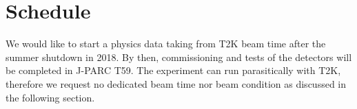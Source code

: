 \section{Schedule}
We would like to start a physics data taking from T2K beam time after the summer shutdown in 2018.
By then, commissioning and tests of the detectors will be completed in J-PARC T59.
The experiment can run parasitically with T2K, therefore we request no dedicated beam time nor beam condition as discussed in the following section.

